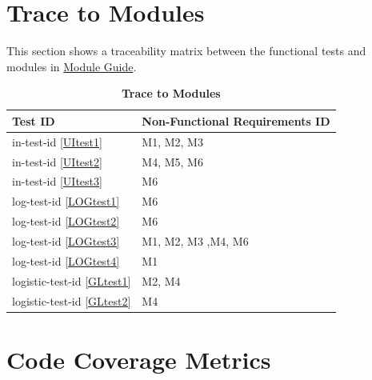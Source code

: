 \documentclass[12pt, titlepage]{article}
\newcommand{\UIref}[1]{in-test-id \ref{#1}}
\newcommand{\LOGref}[1]{log-test-id \ref{#1}}
\newcommand{\GLref}[1]{logistic-test-id \ref{#1}}
\begin{document}
\section{Trace to Modules}
This section shows a traceability matrix between the functional tests and modules in \href{run:../Design/MG/MG.pdf}{Module Guide}.

\begin{table}[H]
\caption{\textbf{Trace to Modules}} \label{TbMTrace}
\begin{tabularx}{\textwidth}{p{3.1cm}X}
\toprule
\textbf{Test ID} & \textbf{Non-Functional Requirements ID} \\
\midrule

\UIref{UItest1} & M1, M2, M3  \\
\UIref{UItest2} & M4, M5, M6 \\
\UIref{UItest3} & M6 \\
\LOGref{LOGtest1} & M6\\
\LOGref{LOGtest2} & M6\\
\LOGref{LOGtest3} & M1, M2, M3 ,M4, M6\\
\LOGref{LOGtest4}  & M1\\
\GLref{GLtest1} & M2, M4\\
\GLref{GLtest2} & M4\\

\bottomrule
\end{tabularx}
\end{table}		

\section{Code Coverage Metrics}




\end{document}
